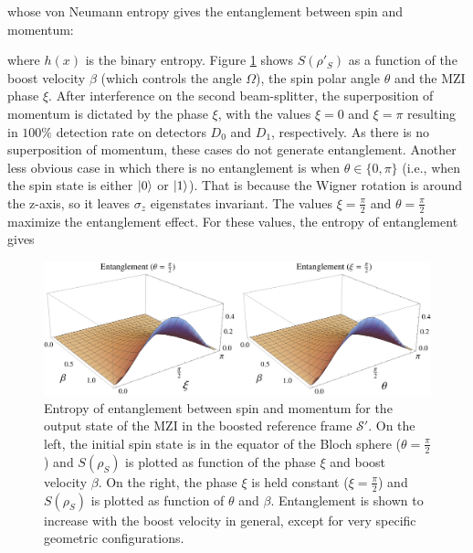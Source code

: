 \documentclass[12pt,a4paper,notitlepage]{report}
\begin{document}
whose von Neumann entropy gives the entanglement between spin and momentum:

%
where $h(x)$ is the binary entropy. Figure \ref{3d-plots} shows $S(\rho'_S)$ as a function of the boost velocity $\beta$ (which controls the angle $\Omega$), the spin polar angle $\theta$ and the MZI phase $\xi$. After interference on the second beam-splitter, the superposition of momentum is dictated by the phase $\xi$, with the values $\xi = 0$ and $\xi = \pi$ resulting in $100\%$ detection rate on detectors $D_0$ and $D_1$, respectively. As there is no superposition of momentum, these cases do not generate entanglement. Another less obvious case in which there is no entanglement is when $\theta \in \{0, \pi \}$ (i.e., when the spin state is either $\ket{0}$ or $\ket{1}$). That is because the Wigner rotation is around the z-axis, so it leaves $\sigma_z$ eigenstates invariant. The values $\xi = \frac{\pi}{2}$ and $\theta = \frac{\pi}{2}$ maximize the entanglement effect. For these values, the entropy of entanglement gives

%
%
\begin{figure}[t]
  \centering
  \includegraphics[scale=.37]{../Figuras/improved/3d-plots-IMPROVED.eps}
  \captionsetup{font=footnotesize, margin=8pt}
  \caption{Entropy of entanglement between spin and momentum for the output state of the MZI in the boosted reference frame $\mathcal{S}'$. On the left, the initial spin state is in the equator of the Bloch sphere ($\theta=\frac{\pi}{2}$) and $S(\rho_S)$ is plotted as function of the phase $\xi$ and boost velocity $\beta$. On the right, the phase $\xi$ is held constant ($\xi = \frac{\pi}{2}$) and $S(\rho_S)$ is plotted as function of $\theta$ and $\beta$. Entanglement is shown to increase with the boost velocity in general, except for very specific geometric  configurations.}
  \label{3d-plots}
\end{figure}
%
\end{document}
